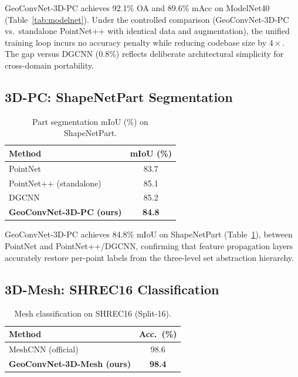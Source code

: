 \documentclass[10pt,conference]{IEEEtran}
\begin{document}
GeoConvNet-3D-PC achieves 92.1\% OA and 89.6\% mAcc on ModelNet40
(Table~\ref{tab:modelnet}). Under the controlled comparison
(GeoConvNet-3D-PC vs.\ standalone PointNet++ with identical data and
augmentation), the unified training loop incurs no accuracy penalty while
reducing codebase size by $4\times$. The gap versus DGCNN (0.8\%) reflects
deliberate architectural simplicity for cross-domain portability.

\subsection{3D-PC: ShapeNetPart Segmentation}

\begin{table}[t]
  \renewcommand{\arraystretch}{1.2}
  \caption{Part segmentation mIoU (\%) on ShapeNetPart.}
  \label{tab:shapenet}
  \centering
  \begin{tabular}{lc}
    \toprule
    \textbf{Method} & \textbf{mIoU (\%)} \\
    \midrule
    PointNet~\cite{qi2017pointnet}          & 83.7 \\
    PointNet++ (standalone)~\cite{qi2017pointnetplusplus} & 85.1 \\
    DGCNN~\cite{wang2019dgcnn}              & 85.2 \\
    \textbf{GeoConvNet-3D-PC (ours)}        & \textbf{84.8} \\
    \bottomrule
  \end{tabular}
\end{table}

GeoConvNet-3D-PC achieves 84.8\% mIoU on ShapeNetPart
(Table~\ref{tab:shapenet}), between PointNet and
PointNet++/DGCNN, confirming that feature propagation layers accurately
restore per-point labels from the three-level set abstraction hierarchy.

\subsection{3D-Mesh: SHREC16 Classification}

\begin{table}[t]
  \renewcommand{\arraystretch}{1.2}
  \caption{Mesh classification on SHREC16 (Split-16).}
  \label{tab:shrec}
  \centering
  \begin{tabular}{lc}
    \toprule
    \textbf{Method} & \textbf{Acc.\ (\%)} \\
    \midrule
    MeshCNN (official)~\cite{hanocka2019meshcnn} & 98.6 \\
    \textbf{GeoConvNet-3D-Mesh (ours)}           & \textbf{98.4} \\
    \bottomrule
  \end{tabular}
\end{table}
\end{document}

